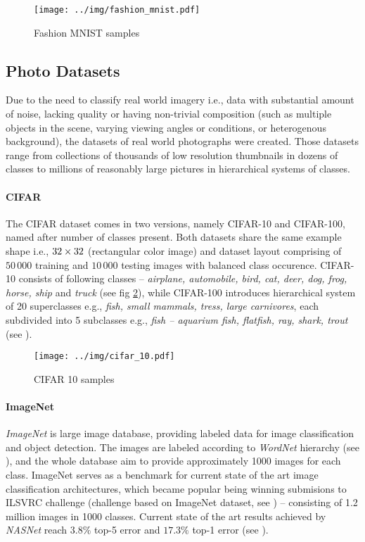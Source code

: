 \begin{figure}
    \centering
    \texttt{[image: ../img/fashion\_mnist.pdf]}
    \caption{Fashion MNIST samples}
    \label{fig:fashion_mnist}
\end{figure}

\subsection{Photo Datasets}
Due to the need to classify real world imagery i.e., data with substantial amount of noise, lacking quality or having non-trivial composition (such as multiple objects in the scene, varying viewing angles or conditions, or heterogenous background), the datasets of real world photographs were created. Those datasets range from collections of thousands of low resolution thumbnails in dozens of classes to millions of reasonably large pictures in hierarchical systems of classes.

\paragraph{CIFAR}

The CIFAR dataset comes in two versions, namely CIFAR-10 and CIFAR-100, named after number of classes present. Both datasets share the same example shape i.e., $32 \times 32 \time 3$ (rectangular color image) and dataset layout comprising of $50\,000$ training and $10\,000$ testing images with balanced class occurence. CIFAR-10 consists of following classes -- \emph{airplane, automobile, bird, cat, deer, dog, frog, horse, ship} and \emph{truck} (see fig \ref{fig:cifar_10}), while CIFAR-100 introduces hierarchical system of 20 superclasses e.g., \emph{fish, small mammals, tress, large carnivores}, each subdivided into 5 subclasses e.g., \emph{fish -- aquarium fish, flatfish, ray, shark, trout} (see \cite{Krizhevsky09learningmultiple}).

\begin{figure}
    \centering
    \texttt{[image: ../img/cifar\_10.pdf]}
    \caption{CIFAR 10 samples}
    \label{fig:cifar_10}
\end{figure}

\paragraph{ImageNet}

\emph{ImageNet} is large image database, providing labeled data for image classification and object detection. The images are labeled according to \emph{WordNet\textsuperscript{\textregistered}} hierarchy (see \cite{wordnet}), and the whole database aim to provide approximately 1000 images for each class. ImageNet serves as a benchmark for current state of the art image classification architectures, which became popular being winning submisions to ILSVRC challenge (challenge based on ImageNet dataset, see \cite{ILSVRC15}) -- consisting of 1.2 million images in 1000 classes. Current state of the art results achieved by \emph{NASNet} reach $3.8\%$ top-5 error and $17.3\%$ top-1 error (see \cite{nasnet}).

